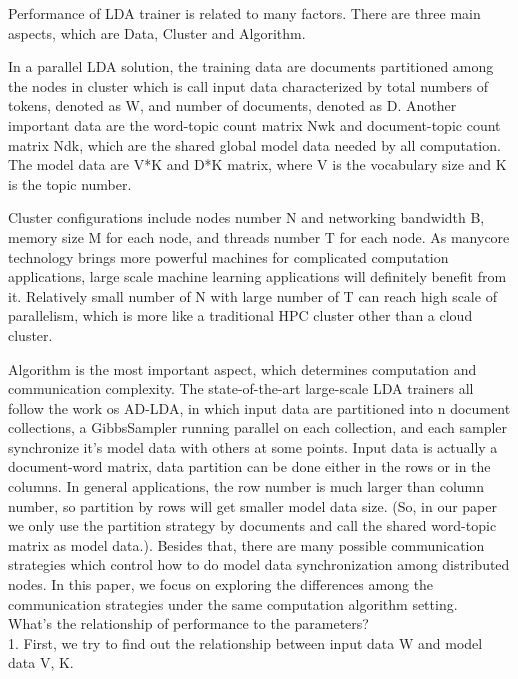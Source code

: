 Performance of LDA trainer is related to many factors. There are three main aspects, which are Data, Cluster  and Algorithm. 

In a parallel LDA solution, the training data are documents partitioned among the nodes in cluster which is call input data characterized by total numbers of tokens, denoted as W, and number of documents, denoted as D. Another important data are the word-topic count matrix Nwk and document-topic count matrix Ndk, which are the shared global model data needed by all computation. The model data are V*K and D*K matrix, where V is the vocabulary size and K is the topic number. 

Cluster configurations include nodes number N and networking bandwidth B, memory size M for each node, and threads number T for each node. As manycore technology brings more powerful machines for complicated computation applications, large scale machine learning applications will definitely benefit from it. Relatively small number of N with large number of T can reach high scale of parallelism, which is more like a traditional HPC cluster other than a cloud cluster.

Algorithm is the most important aspect, which determines computation and communication complexity. The state-of-the-art large-scale LDA trainers all follow the work os AD-LDA, in which input data are partitioned into n document collections, a GibbsSampler running parallel on each collection, and each sampler synchronize it's model data with others at some points. Input data is actually a document-word matrix, data partition can be done either in the rows or in the columns. In general applications, the row number is much larger than column number, so partition by rows will get smaller model data size. (So, in our paper we only use the partition strategy by documents and call the shared word-topic matrix as model data.). Besides that, there are many possible communication strategies which control how to do model data synchronization among distributed nodes. In this paper, we focus on exploring the differences among the communication strategies under the same computation algorithm setting.  \\

What's the relationship of performance to the parameters? \\

1. First, we try to find out the relationship between input data W and model data V, K.  \\

